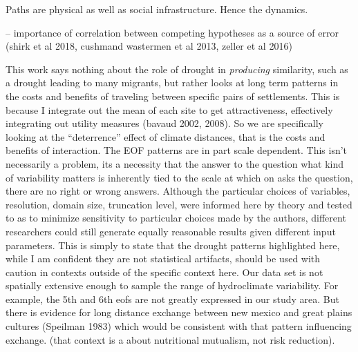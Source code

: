 \documentclass[10pt]{iopart}
\begin{document}
Paths are physical as well as social infrastructure. Hence the dynamics.

-- importance of correlation between competing hypotheses as a source of error (shirk et al 2018, cushmand wastermen et al 2013, zeller et al 2016)

This work says nothing about the role of drought in \textit{producing} similarity, such as a drought leading to many migrants, but rather looks at long term patterns in the costs and benefits of traveling between specific pairs of settlements. This is because I integrate out the mean of each site to get attractiveness, effectively integrating out utility measures (bavaud 2002, 2008). So we are specifically looking at the ``deterrence'' effect of climate distances, that is the costs and benefits of interaction.
The EOF patterns are in part scale dependent. This isn't necessarily a problem, its a necessity that the answer to the question what kind of variability matters is inherently tied to the scale at which on asks the question, there are no right or wrong answers. Although the particular choices of variables, resolution, domain size, truncation level, were informed here by theory and tested to as to minimize sensitivity to particular choices made by the authors, different researchers could still generate equally reasonable results given  different input parameters.  This is simply to state that the drought patterns highlighted here, while I am confident they are not statistical artifacts, should be used with caution in contexts outside of the specific context here. Our data set is not spatially extensive enough to sample the range of hydroclimate variability. For example, the 5th and 6th eofs are not greatly expressed in our study area. But there is evidence for long distance exchange between new mexico and great plains cultures (Speilman 1983) which would be consistent with that pattern influencing exchange. (that context is a about nutritional mutualism, not risk reduction).


\end{document}
